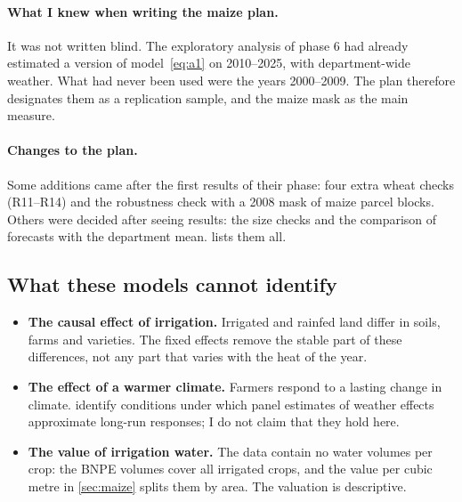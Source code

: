 \paragraph{What I knew when writing the maize plan.} It was not written blind. The exploratory analysis of phase 6 had already estimated a version of model~\eqref{eq:a1} on 2010--2025, with department-wide weather. What had never been used were the years 2000--2009. The plan therefore designates them as a replication sample, and the maize mask as the main measure.

\paragraph{Changes to the plan.} Some additions came after the first results of their phase: four extra wheat checks (R11--R14) and the robustness check with a 2008 mask of maize parcel blocks. Others were decided after seeing results: the size checks and the comparison of forecasts with the department mean.  lists them all.

\subsection{What these models cannot identify}
\label{subsec:not-identified}

\begin{itemize}
  \item \textbf{The causal effect of irrigation.} Irrigated and rainfed land differ in soils, farms and varieties. The fixed effects remove the stable part of these differences, not any part that varies with the heat of the year.
  \item \textbf{The effect of a warmer climate.} Farmers respond to a lasting change in climate. \textcite{merel2021} identify conditions under which panel estimates of weather effects approximate long-run responses; I do not claim that they hold here.
  \item \textbf{The value of irrigation water.} The data contain no water volumes per crop: the BNPE volumes cover all irrigated crops, and the value per cubic metre in \cref{sec:maize} splits them by area. The valuation is descriptive.
\end{itemize}
